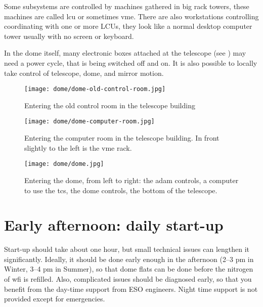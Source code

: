\documentclass[11pt,fleqn,a4paper]{book}
\begin{document}
Some subsystems are controlled by machines gathered in big rack towers, these machines are called \gls{lcu} or sometimes \gls{vme}.  There are also workstations controlling coordinating with one or more LCUs, they look like a normal desktop computer tower usually with no screen or keyboard.

In the \gls{dome} itself, many electronic boxes attached at the telescope (see ) may need a \gls{power cycle}, that is being switched off and on.  It is also possible to locally take control of telescope, dome, and mirror motion.

\begin{figure}[!ht]
\centering
\texttt{[image: dome/dome-old-control-room.jpg]}
\caption{Entering the old control room in the telescope building}
\label{fig:old-control-room}
\end{figure}

\begin{figure}[!ht]
\centering
\texttt{[image: dome/dome-computer-room.jpg]}
\caption[Entering the computer room in the telescope building]{Entering the \gls{computer room} in the telescope building. In front slightly to the left is the \gls{vme} rack.} 
\label{fig:computer-room}
\end{figure}

\begin{figure}[!ht]
\centering
\texttt{[image: dome/dome.jpg]}
\caption[Entering the dome]{Entering the \gls{dome}, from left to right: the \gls{adam} controls,
a computer to use the \gls{tcs}, the dome controls, the bottom of the telescope.}
\label{fig:dome}
\end{figure}

\cleardoublepage



%                                       
%                                  
%
%


\chapter{Early afternoon: daily start-up}
\label{chap:startup}

Start-up should take about one hour, but small technical issues can lengthen it significantly.  Ideally, it should be done early enough in the afternoon (2--3 pm in Winter, 3--4 pm in Summer), so that \gls{dome flats} can be done before the nitrogen of \gls{wfi} is refilled.  Also, complicated issues should be diagnosed early, so that you benefit from the day-time support from ESO engineers.  Night time support is not provided except for emergencies.
\end{document}
